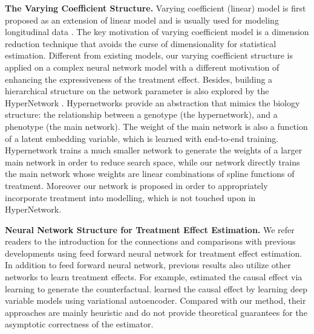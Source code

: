 \textbf{The Varying Coefficient Structure.}
Varying coefficient (linear) model is first proposed as an extension of linear model \citep{hastie1993varying,fan1999statistical} and is usually used for modeling longitudinal data \citep{huang2004polynomial, zhang2015varying, li2017functional, ye2019finite}. The key motivation of varying coefficient model is a dimension reduction technique that avoids the curse of dimensionality for statistical estimation. Different from existing models, our varying coefficient structure is applied on a complex neural network model with a different motivation of enhancing the expressiveness of the treatment effect. Besides, building a hierarchical structure on the network parameter is also explored by the HyperNetwork \citep{stanley2009hypercube,ha2016hypernetworks}. Hypernetworks provide an abstraction that mimics the biology structure: the relationship between a genotype (the hypernetwork), and a phenotype (the main network). The weight of the main network is also a function of a latent embedding variable, which is learned with end-to-end training. %
Hypernetwork trains a much smaller network to generate the weights of a larger main network in order to reduce search space, while our network directly trains the main network whose weights are linear combinations of spline functions of treatment. Moreover our network is proposed in order to appropriately incorporate treatment into modelling, which is not touched upon in HyperNetwork.


\textbf{Neural Network Structure for Treatment Effect Estimation.}
We refer readers to the introduction for the connections and comparisons with previous developments using feed forward neural network for treatment effect estimation. In addition to feed forward neural network, previous results also utilize other networks to learn treatment effects. For example, \cite{yoon2018ganite,bica2020estimating} estimated the causal effect via learning to generate the counterfactual.  \cite{louizos2017causal} learned the causal effect by learning deep variable models using variational autoencoder. Compared with our method, their approaches are mainly heuristic and do not provide theoretical guarantees for the asymptotic correctness of the estimator.

